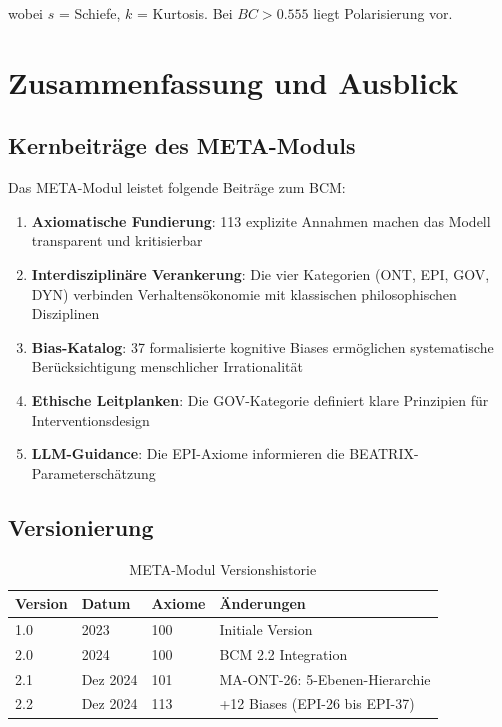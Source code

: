 \documentclass[11pt,a4paper]{article}
\theoremstyle{definition}
\theoremstyle{plain}
\newcommand{\BCM}{\textsc{BCM}}
\newcommand{\META}{\textsc{META}}
\begin{document}
wobei $s$ = Schiefe, $k$ = Kurtosis. Bei $BC > 0.555$ liegt Polarisierung vor.

\section{Zusammenfassung und Ausblick}

\subsection{Kernbeiträge des META-Moduls}

Das \META-Modul leistet folgende Beiträge zum \BCM:

\begin{enumerate}
    \item \textbf{Axiomatische Fundierung}: 113 explizite Annahmen machen das Modell transparent und kritisierbar
    \item \textbf{Interdisziplinäre Verankerung}: Die vier Kategorien (ONT, EPI, GOV, DYN) verbinden Verhaltensökonomie mit klassischen philosophischen Disziplinen
    \item \textbf{Bias-Katalog}: 37 formalisierte kognitive Biases ermöglichen systematische Berücksichtigung menschlicher Irrationalität
    \item \textbf{Ethische Leitplanken}: Die GOV-Kategorie definiert klare Prinzipien für Interventionsdesign
    \item \textbf{LLM-Guidance}: Die EPI-Axiome informieren die BEATRIX-Parameterschätzung
\end{enumerate}

\subsection{Versionierung}

\begin{table}[h]
\centering
\caption{META-Modul Versionshistorie}
\begin{tabular}{@{}llll@{}}
\toprule
\textbf{Version} & \textbf{Datum} & \textbf{Axiome} & \textbf{Änderungen} \\
\midrule
1.0 & 2023 & 100 & Initiale Version \\
2.0 & 2024 & 100 & BCM 2.2 Integration \\
2.1 & Dez 2024 & 101 & MA-ONT-26: 5-Ebenen-Hierarchie \\
2.2 & Dez 2024 & 113 & +12 Biases (EPI-26 bis EPI-37) \\
\bottomrule
\end{tabular}
\end{table}
\end{document}
